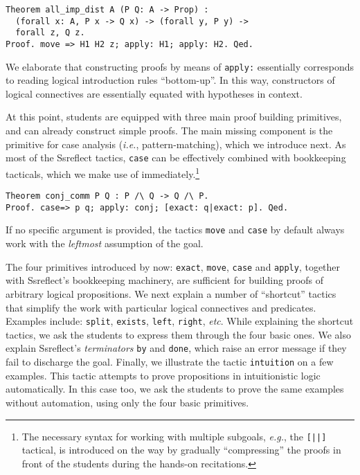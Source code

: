 \documentclass[blockstyle,preprint,nocopyrightspace]{sigplanconf}
\newcommand{\is}[1]{\textcolor{blue}{(Ilya: {#1})}}
\newcommand{\an}[1]{\textcolor{red}{(Aleks: {#1})}}
\newcommand{\code}[1]{\lstinline{#1}}
\newcommand{\etc}{\emph{etc}}
\newcommand{\ie}{\emph{i.e.}\xspace}
\newcommand{\eg}{\emph{e.g.}\xspace}
\begin{document}

\begin{lstlisting}
Theorem all_imp_dist A (P Q: A -> Prop) : 
  (forall x: A, P x -> Q x) -> (forall y, P y) -> 
  forall z, Q z. 
Proof. move => H1 H2 z; apply: H1; apply: H2. Qed.
\end{lstlisting}
%
We elaborate that constructing proofs by means of \code{apply:}
essentially corresponds to reading logical introduction rules
``bottom-up''. In this way, constructors of logical connectives are
essentially equated with hypotheses in context.

At this point, students are equipped with three main proof building
primitives, and can already construct simple proofs. The main missing
component is the primitive for case analysis (\ie, pattern-matching),
which we introduce next. As most of the Ssreflect tactics, \code{case}
can be effectively combined with bookkeeping tacticals, which we make
use of immediately.\footnote{The necessary syntax for working with
  multiple subgoals, \eg, the \code{[||]} tactical, is introduced on
  the way by gradually ``compressing'' the proofs in front of the
  students during the hands-on recitations.}
%
\begin{lstlisting}
Theorem conj_comm P Q : P /\ Q -> Q /\ P.
Proof. case=> p q; apply: conj; [exact: q|exact: p]. Qed.
\end{lstlisting}
%
If no specific argument is provided, the tactics \code{move} and
\code{case} by default always work with the \emph{leftmost} assumption
of the goal.

The four primitives introduced by now: \code{exact}, \code{move},
\code{case} and \code{apply}, together with Ssreflect's bookkeeping
machinery, are sufficient for building proofs of arbitrary logical
propositions.
%
%
%
%
We next explain a number of ``shortcut'' tactics that simplify the
work with particular logical connectives and predicates. Examples
include: \code{split}, \code{exists}, \code{left}, \code{right}, \etc.
While explaining the shortcut tactics, we ask the students to express
them through the four basic ones. We also explain Ssreflect's
\emph{terminators} \code{by} and \code{done}, which raise an error
message if they fail to discharge the goal. Finally, we illustrate the
tactic \code{intuition} on a few examples. This tactic attempts to
prove propositions in intuitionistic logic automatically. In this case
too, we ask the students to prove the same examples without
automation, using only the four basic primitives.
\end{document}
